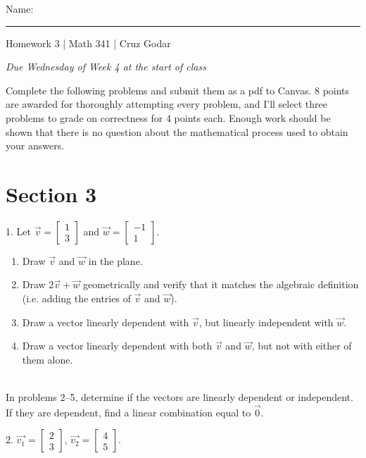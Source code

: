 \documentclass{article}
\begin{document}
\Large Name: \rule{2in}{0.15mm} \hfill Homework 3 | Math 341 | Cruz Godar \vspace{4pt} \normalsize

\textit{Due Wednesday of Week 4 at the start of class}

Complete the following problems and submit them as a pdf to Canvas. 8 points are awarded for thoroughly attempting every problem, and I'll select three problems to grade on correctness for 4 points each. Enough work should be shown that there is no question about the mathematical process used to obtain your answers.

\section{Section 3}

1. Let $\displaystyle \vec{v} = \left[\begin{array}{c} 1 \\ 3 \end{array}\right]$ and $\displaystyle \vec{w} = \left[\begin{array}{c} -1 \\ 1 \end{array}\right]$.

\begin{enumerate}

	\item Draw $\vec{v}$ and $\vec{w}$ in the plane.

	\item Draw $2\vec{v} + \vec{w}$ geometrically and verify that it matches the algebraic definition (i.e. adding the entries of $\vec{v}$ and $\vec{w}$).

	\item Draw a vector linearly dependent with $\vec{v}$, but linearly independent with $\vec{w}$.

	\item Draw a vector linearly dependent with both $\vec{v}$ and $\vec{w}$, but not with either of them alone.

\end{enumerate}

~\\

In problems 2--5, determine if the vectors are linearly dependent or independent. If they are dependent, find a linear combination equal to $\vec{0}$.

2. $\vec{v_1} = \left[\begin{array}{c} 2 \\ 3 \end{array}\right]$, $\vec{v_2} = \left[\begin{array}{c} 4 \\ 5 \end{array}\right]$.
\end{document}
